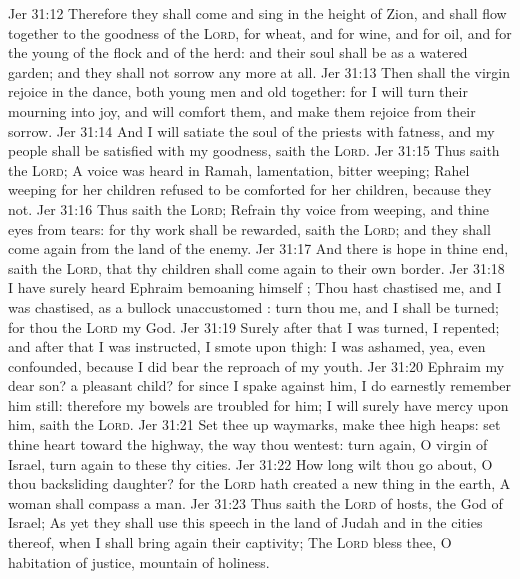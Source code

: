 \vs Jer 31:12 Therefore they shall come and sing in the height of Zion, and shall flow together to the goodness of the \textsc{Lord}, for wheat, and for wine, and for oil, and for the young of the flock and of the herd: and their soul shall be as a watered garden; and they shall not sorrow any more at all.
\vs Jer 31:13 Then shall the virgin rejoice in the dance, both young men and old together: for I will turn their mourning into joy, and will comfort them, and make them rejoice from their sorrow.
\vs Jer 31:14 And I will satiate the soul of the priests with fatness, and my people shall be satisfied with my goodness, saith the \textsc{Lord}.
\vs Jer 31:15 Thus saith the \textsc{Lord}; A voice was heard in Ramah, lamentation,  bitter weeping; Rahel weeping for her children refused to be comforted for her children, because they  not.
\vs Jer 31:16 Thus saith the \textsc{Lord}; Refrain thy voice from weeping, and thine eyes from tears: for thy work shall be rewarded, saith the \textsc{Lord}; and they shall come again from the land of the enemy.
\vs Jer 31:17 And there is hope in thine end, saith the \textsc{Lord}, that thy children shall come again to their own border.
\vs Jer 31:18 I have surely heard Ephraim bemoaning himself ; Thou hast chastised me, and I was chastised, as a bullock unaccustomed : turn thou me, and I shall be turned; for thou  the \textsc{Lord} my God.
\vs Jer 31:19 Surely after that I was turned, I repented; and after that I was instructed, I smote upon  thigh: I was ashamed, yea, even confounded, because I did bear the reproach of my youth.
\vs Jer 31:20  Ephraim my dear son?  a pleasant child? for since I spake against him, I do earnestly remember him still: therefore my bowels are troubled for him; I will surely have mercy upon him, saith the \textsc{Lord}.
\vs Jer 31:21 Set thee up waymarks, make thee high heaps: set thine heart toward the highway,  the way  thou wentest: turn again, O virgin of Israel, turn again to these thy cities.
\vs Jer 31:22 How long wilt thou go about, O thou backsliding daughter? for the \textsc{Lord} hath created a new thing in the earth, A woman shall compass a man.
\vs Jer 31:23 Thus saith the \textsc{Lord} of hosts, the God of Israel; As yet they shall use this speech in the land of Judah and in the cities thereof, when I shall bring again their captivity; The \textsc{Lord} bless thee, O habitation of justice,  mountain of holiness.
